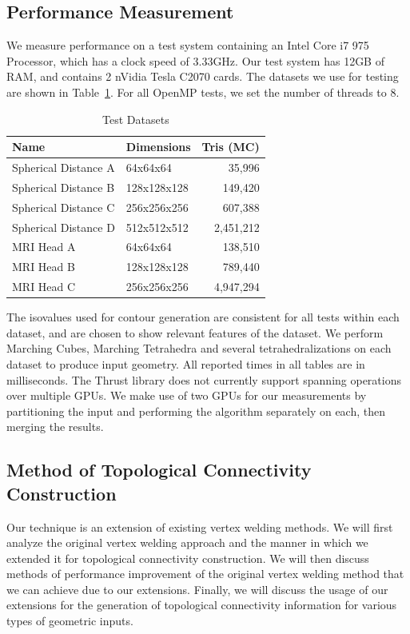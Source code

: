 \documentclass[journal]{vgtc}                %
\begin{document}
\subsection{Performance Measurement}

We measure performance on a test system containing an Intel Core i7 975 Processor, which has a clock speed of 3.33GHz. Our test system has 12GB of RAM, and contains 2 nVidia Tesla C2070 cards. The datasets we use for testing are shown in Table~\ref{tab:datasets}. For all OpenMP tests, we set the number of threads to 8.


\begin{table}[h!]
\begin{center}
\begin{tabular}{p{2.7cm} p{1.9cm} r}
Name & Dimensions &  Tris (MC)\\
\hline
Spherical Distance A & 64x64x64 & 35,996\\
Spherical Distance B & 128x128x128 & 149,420 \\
Spherical Distance C & 256x256x256 & 607,388 \\
Spherical Distance D & 512x512x512 & 2,451,212 \\
MRI Head A& 64x64x64 & 138,510 \\
MRI Head B& 128x128x128 & 789,440 \\
MRI Head C& 256x256x256 & 4,947,294 \\
\end{tabular}
\end{center}
\caption{Test Datasets}
\label{tab:datasets}
\end{table}


The isovalues used for contour generation are consistent for all tests within each dataset, and are chosen to show relevant features of the dataset. We perform Marching Cubes, Marching Tetrahedra and several tetrahedralizations on each dataset to produce input geometry. All reported times in all tables are in milliseconds.  The Thrust library does not currently support spanning operations over multiple GPUs. We make use of two GPUs for our measurements by partitioning the input and performing the algorithm separately on each, then merging the results.


\subsection{Method of Topological Connectivity Construction}
Our technique is an extension of existing vertex welding methods. We will first analyze the original vertex welding approach and the manner in which we extended it for topological connectivity construction. We will then discuss methods of performance improvement of the original vertex welding method that we can achieve due to our extensions. Finally, we will discuss the usage of our extensions for the generation of topological connectivity information for various types of geometric inputs.
\end{document}
